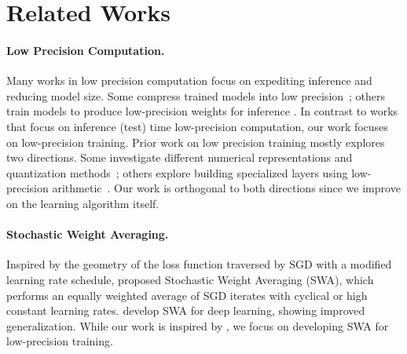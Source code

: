 \documentclass{article}
\begin{document}
\section{Related Works}
\label{sec:related}

\paragraph{Low Precision Computation.} 
Many works in low precision computation focus on expediting inference and reducing model size. 
Some compress trained models into low precision~\cite{deepCompression}; others train models to produce low-precision weights for inference \cite{binary-net,ternary-quant,incremental-quant}. 
In contrast to works that focus on inference (test) time low-precision computation, our work focuses on low-precision training. 
Prior work on low precision training mostly explores two directions.
Some investigate different numerical representations and quantization methods~\cite{gupta2015deep,flexpoint,log-quant,dyanmic-fixed-point,8bitfloat}; others explore building specialized layers using low-precision arithmetic~\cite{WAGE,xor-net,dorefa-net,binaryconnect,scalable8bittraining}.
Our work is orthogonal to both directions since we improve on the learning algorithm itself.

\paragraph{Stochastic Weight Averaging.}
Inspired by the geometry of the loss function traversed by SGD with a modified learning rate schedule, \citet{SWA} proposed Stochastic Weight Averaging (SWA), which performs an equally weighted average of SGD iterates with cyclical or high constant learning rates. \citet{SWA} develop SWA for deep learning, showing improved generalization. While our work is inspired by \citet{SWA}, we focus on developing SWA for low-precision training.
\end{document}
